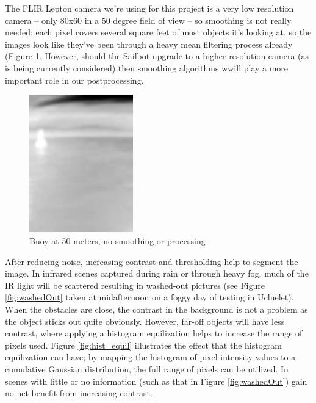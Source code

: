 The FLIR Lepton camera we're using for this project is a very low resolution camera -- only 80x60 in a 50 degree field of view -- so smoothing is not really needed; each pixel covers several square feet of most objects it's looking at, so the images look like they've been through a heavy mean filtering process already (Figure \ref{fig:buoy_ex}. However, should the Sailbot upgrade to a higher resolution camera (as is being currently considered) then smoothing algorithms wwill play a more important role in our postprocessing. 

\begin{figure}
\centering
\includegraphics[width=0.4\textwidth]{"./image/buoy_example"}
\caption{Buoy at 50 meters, no smoothing or processing}
\label{fig:buoy_ex}
\end{figure}

After reducing noise, increasing contrast and thresholding help to segment the image. In infrared scenes captured during rain or through heavy fog, much of the IR light will be scattered resulting in washed-out pictures (see Figure \ref{fig:washedOut} taken at midafternoon on a foggy day of testing in Ucluelet). When the obstacles are close, the contrast in the background is not a problem as the object sticks out quite obviously. However, far-off objects will have less contrast, where applying a histogram equilization helps to increase the range of pixels used. Figure \ref{fig:hist_equil} illustrates the effect that the histogram equilization can have; by mapping the histogram of pixel intensity values to a cumulative Gaussian distribution, the full range of pixels can be utilized. In scenes with little or no information (such as that in Figure \ref{fig:washedOut}) gain no net benefit from increasing contrast.

